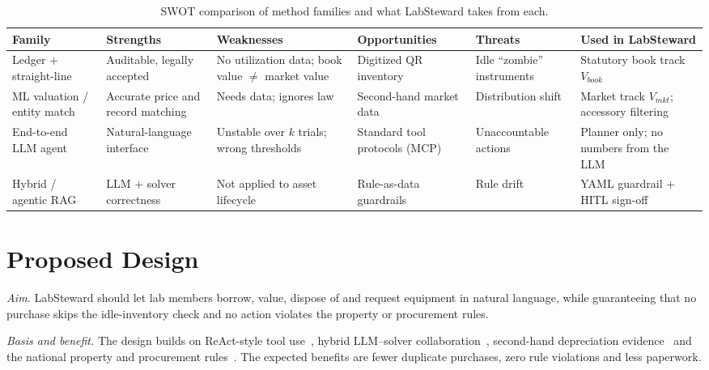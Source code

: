 \documentclass[conference]{IEEEtran}
\begin{document}
\begin{table}[t]
\centering
\caption{SWOT comparison of method families and what LabSteward takes from each.}
\label{tab:swot}
\footnotesize
\begin{tabular}{p{2.6cm}p{2.7cm}p{2.7cm}p{2.7cm}p{2.7cm}p{3.0cm}}
\toprule
Family & Strengths & Weaknesses & Opportunities & Threats & Used in LabSteward \\
\midrule
Ledger + straight-line & Auditable, legally accepted & No utilization data; book value $\neq$ market value & Digitized QR inventory & Idle ``zombie'' instruments & Statutory book track $V_{book}$ \\
ML valuation / entity match~\cite{huymajer2025residual,peeters2025entity} & Accurate price and record matching & Needs data; ignores law & Second-hand market data & Distribution shift & Market track $V_{mkt}$; accessory filtering \\
End-to-end LLM agent~\cite{yao2023react,yao2024taubench} & Natural-language interface & Unstable over $k$ trials; wrong thresholds & Standard tool protocols (MCP) & Unaccountable actions & Planner only; no numbers from the LLM \\
Hybrid / agentic RAG~\cite{duan2025askclarify,singh2025agenticrag} & LLM + solver correctness & Not applied to asset lifecycle & Rule-as-data guardrails & Rule drift & YAML guardrail + HITL sign-off \\
\bottomrule
\end{tabular}
\end{table}

\section{Proposed Design}
\textit{Aim.} LabSteward should let lab members borrow, value, dispose of
and request equipment in natural language, while guaranteeing that no
purchase skips the idle-inventory check and no action violates the
property or procurement rules.

\textit{Basis and benefit.} The design builds on ReAct-style tool
use~\cite{yao2023react}, hybrid LLM--solver
collaboration~\cite{duan2025askclarify}, second-hand depreciation
evidence~\cite{reznicek_price} and the national property and procurement
rules~\cite{gpa_tw}. The expected benefits are fewer duplicate purchases,
zero rule violations and less paperwork.
\end{document}
